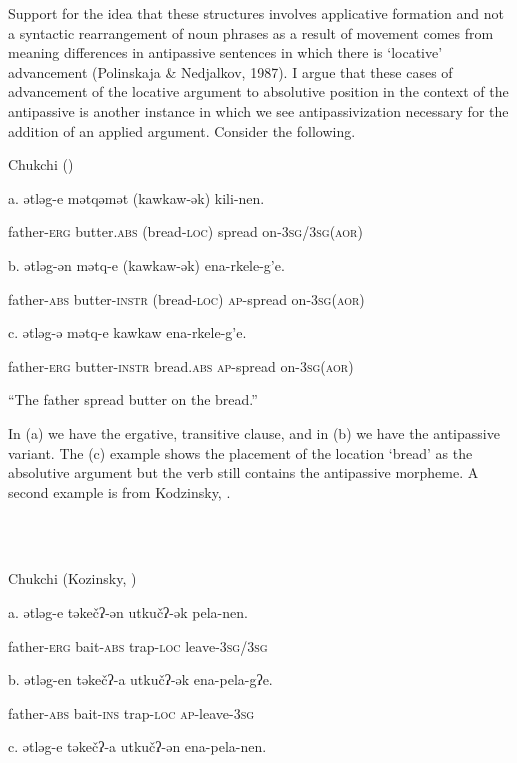 \documentclass[output=paper,modfonts,nonflat]{langsci/langscibook}
\begin{document}
Support for the idea that these structures involves applicative formation and not a syntactic rearrangement of noun phrases as a result of movement comes from meaning differences in antipassive sentences in which there is ‘locative’ advancement (Polinskaja \& Nedjalkov, 1987). I argue that these cases of advancement of the locative argument to absolutive position in the context of the antipassive is another instance in which we see antipassivization necessary for the addition of an applied argument.  Consider the following.

   Chukchi (\citealt{PolinskajaNedjalkov1987})  

a.   ətləg-e  mətqəmət  (kawkaw-ək)  kili-nen.

father-\textsc{erg}  butter.\textsc{abs}  (bread-\textsc{loc})   spread on{}-3\textsc{sg}/3\textsc{sg}(\textsc{aor})

b.   ətləg-ən  mətq-e  (kawkaw-ək)  ena-rkele-g’e.

  father-\textsc{abs}  butter-\textsc{instr}  (bread-\textsc{loc})  \textsc{ap}{}-spread on-3\textsc{sg}(\textsc{aor})

c.  ətləg-ə  mətq-e  kawkaw  ena-rkele-g’e.

  father-\textsc{erg}  butter-\textsc{instr}  bread.\textsc{abs}  \textsc{ap}{}-spread on-3\textsc{sg}(\textsc{aor})

  “The father spread butter on the bread.”

In (a) we have the ergative, transitive clause, and in (b) we have the antipassive variant.  The (c) example shows the placement of the location ‘bread’ as the absolutive argument but the verb still contains the antipassive morpheme.  A second example is from Kodzinsky, \citet{NedjalkovPolinskaja1988}.

\ea%
    \label{ex:key:11}
    \gll\\
        \\
    \glt
    \z

          Chukchi (Kozinsky, \citealt{NedjalkovPolinskaja1988})

a.  ətləg-e   təkečʔ-ən   utkučʔ-ək   pela-nen.

  father-\textsc{erg}   bait-\textsc{abs}   trap-\textsc{loc}   leave-3\textsc{sg}/3\textsc{sg}

b.   ətləg-en   təkečʔ-a   utkučʔ-ək   ena-pela-gʔe.

  father-\textsc{abs}  bait-\textsc{ins}  trap-\textsc{loc}  \textsc{ap}{}-leave-3\textsc{sg}

c.  ətləg-e  təkečʔ-a  utkučʔ-ən  ena-pela-nen.
\end{document}
